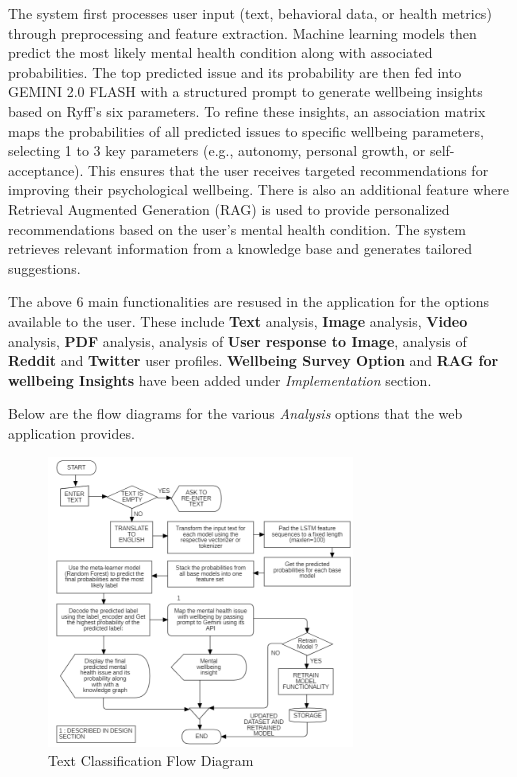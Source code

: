 \noindent
The system first processes user input (text, behavioral data, or health metrics) through preprocessing and feature extraction. Machine learning models then predict the most likely mental health condition along with associated probabilities. The top predicted issue and its probability are then fed into GEMINI 2.0 FLASH with a structured prompt to generate wellbeing insights based on Ryff’s six parameters. To refine these insights, an association matrix maps the probabilities of all predicted issues to specific wellbeing parameters, selecting 1 to 3 key parameters (e.g., autonomy, personal growth, or self-acceptance). This ensures that the user receives targeted recommendations for improving their psychological wellbeing. There is also an additional feature where Retrieval Augmented Generation (RAG) is used to provide personalized recommendations based on the user’s mental health condition. The system retrieves relevant information from a knowledge base and generates tailored suggestions.
\vspace{1em}

\noindent
The above 6 main functionalities are resused in the application for the options available to the user. These include \textbf{Text} analysis, \textbf{Image} analysis, \textbf{Video} analysis, \textbf{PDF} analysis, analysis of \textbf{User response to Image}, analysis of \textbf{Reddit} and \textbf{Twitter} user profiles. \textbf{Wellbeing Survey Option} and \textbf{RAG for wellbeing Insights} have been added under \textit{Implementation} section.

\vspace{1em}

\noindent
Below are the flow diagrams for the various \textit{Analysis} options that the web application provides.

\begin{figure}[H]  
    \centering
    \includegraphics[width=0.72\textwidth]{Images/APP TEXT OPTION.png}  
    \caption*{Text Classification Flow Diagram}
    \label{012i}  %
\end{figure}

